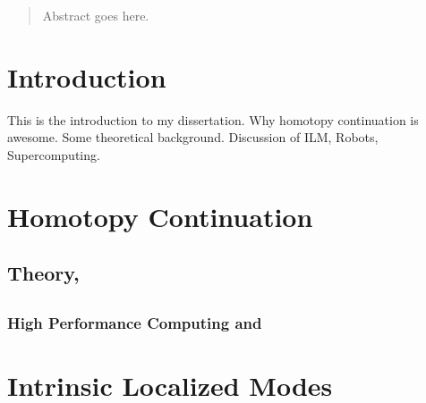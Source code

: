 \documentclass[12pt]{report}
\begin{document}
\pagestyle{plain} 
\setcounter{page}{1}


\maketitle


\begin{abstract}
Abstract goes here. %
\end{abstract}

\singlespace{\tableofcontents }

\eject
{} 
\setcounter{page}{1}
\eject



\chapter{Introduction}

This is the introduction to my dissertation.  Why homotopy continuation is awesome.  Some theoretical background.  Discussion of ILM, Robots, Supercomputing.

\chapter{Homotopy Continuation}

\section{Theory, \bertini}
\section{\paramatopy}
\subsection{High Performance Computing and \paramatopy}
	
	
	

%
%
%
%
	
	
	
	
\chapter{Intrinsic Localized Modes}
\end{document}
